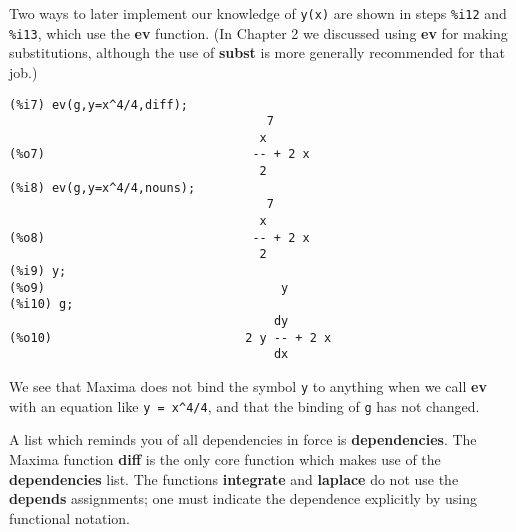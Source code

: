 \documentclass[12pt]{article}
\begin{document}
\smallskip


Two ways to later implement our knowledge of \verb|y(x)| are shown in steps
\verb|%i12| and \verb|%i13|, which use the \textbf{ev} function.
(In Chapter 2 we discussed using \textbf{ev} for making substitutions, although
  the use of \textbf{subst} is more generally recommended for that job.)
\small
\begin{verbatim}
(%i7) ev(g,y=x^4/4,diff);
                                    7
                                   x
(%o7)                             -- + 2 x
                                   2
(%i8) ev(g,y=x^4/4,nouns);
                                    7
                                   x
(%o8)                             -- + 2 x
                                   2
(%i9) y;
(%o9)                                 y								   
(%i10) g;
                                     dy
(%o10)                           2 y -- + 2 x
                                     dx
\end{verbatim}
\normalsize
We see that Maxima does not bind the symbol \verb|y| to anything when we
  call \textbf{ev} with an equation like \verb|y = x^4/4|,
  and that the binding of \verb|g| has not changed.

\smallskip
  
A list which reminds you of all dependencies in force is \textbf{dependencies}.
The Maxima function \textbf{diff} is the only core function which makes use of 
  the \textbf{dependencies} list.
The functions \textbf{integrate} and \textbf{laplace} do not use the \textbf{depends}
  assignments; one must indicate the dependence explicitly by using functional notation.  

\smallskip
  
\end{document}
